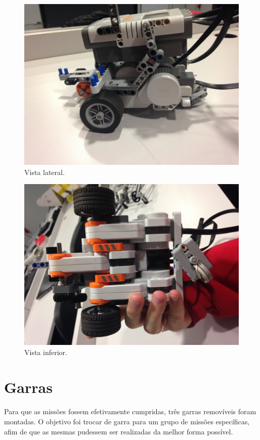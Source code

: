\documentclass{article}
\begin{document}
	\begin{figure}[h!]
		\includegraphics[width=\linewidth]{../Images/robot_3.JPG}
		\caption{Vista lateral.}
		\label{fig:robot_3}
	\end{figure}

	\begin{figure}[h!]
		\includegraphics[width=\linewidth]{../Images/robot_4.JPG}
		\caption{Vista inferior.}
		\label{fig:robot_4}
	\end{figure}

\newpage
\section{Garras}
	\paragraph{}
		Para que as missões fossem efetivamente cumpridas, três garras 
		removíveis foram montadas. O objetivo foi trocar de garra para um grupo 
		de missões específicas, afim de que as mesmas pudessem ser realizadas da 
		melhor forma possível.
\end{document}
